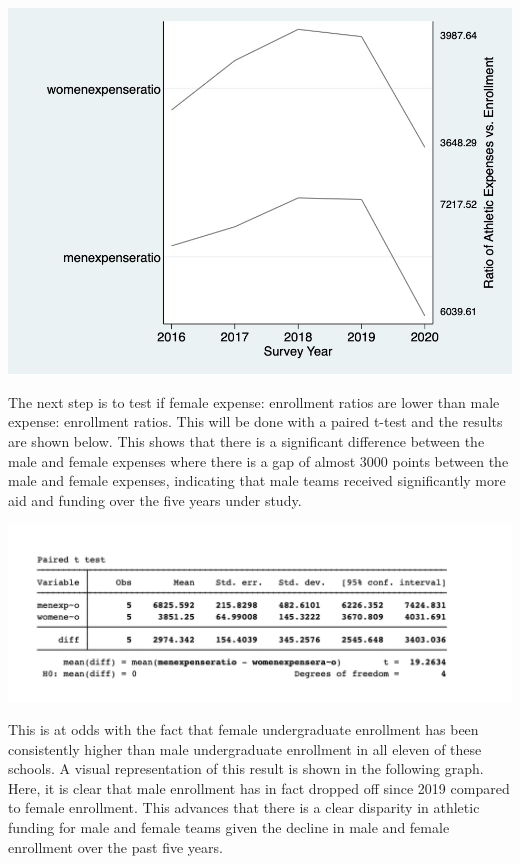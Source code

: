 \documentclass[11pt]{article}
\begin{document}
\includegraphics[scale = 0.75]{Graph.png}

The next step is to test if female expense: enrollment ratios are lower than male expense: enrollment ratios. This will be done with a paired t-test and the results are shown below. This shows that there is a significant difference between the male and female expenses where there is a gap of almost 3000 points between the male and female expenses, indicating that male teams received significantly more aid and funding over the five years under study.

\includegraphics[scale = 0.75]{table.png}

This is at odds with the fact that female undergraduate enrollment has been consistently higher than male undergraduate enrollment in all eleven of these schools. A visual representation of this result is shown in the following graph. Here, it is clear that male enrollment has in fact dropped off since 2019 compared to female enrollment. This advances that there is a clear disparity in athletic funding for male and female teams given the decline in male and female enrollment over the past five years.
\end{document}
